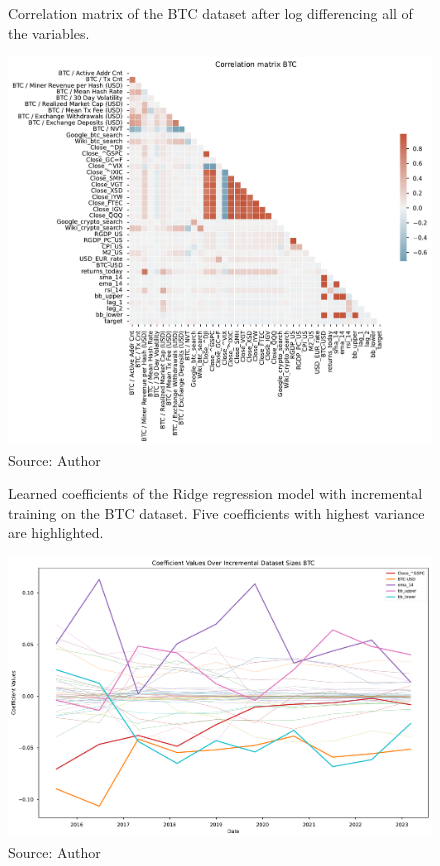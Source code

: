 \begin{figure}[!h]
    \centering
    \caption{Correlation matrix of the BTC dataset after
    log differencing all of the variables.}
    \includegraphics[width=1\textwidth]{Figures/Corr_btc_logdiff.pdf}
    \caption*{Source: Author}
    \label{fig:Corr_btc_logdiff}
\end{figure}




\begin{figure}[!h]
    \centering
    \caption{Learned coefficients of the Ridge regression model
    with incremental training on the BTC dataset. Five 
    coefficients with highest variance are highlighted.}
    \includegraphics[width=1\textwidth]{Figures/coefficient_values_incremental_btc.pdf}
    \caption*{Source: Author}
    \label{fig:coefs_incremental_btc}
\end{figure}

